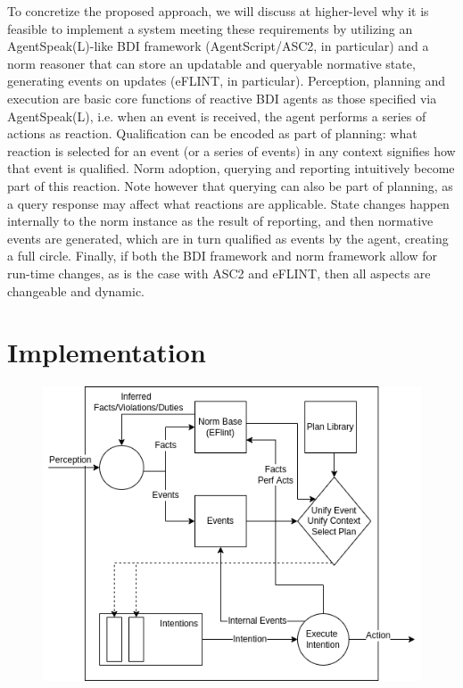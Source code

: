 
To concretize the proposed approach, we will discuss at higher-level why it is feasible to implement a system meeting these requirements by utilizing an AgentSpeak(L)-like BDI framework (AgentScript/ASC2, in particular) and a norm reasoner that can store an updatable and queryable normative state, generating events on updates (eFLINT, in particular). Perception, planning and execution are basic core functions of reactive BDI agents as those specified via AgentSpeak(L), i.e. when an event is received, the agent performs a series of actions as reaction. Qualification can be encoded as part of planning: what reaction is selected for an event (or a series of events) in any context signifies how that event is qualified. Norm adoption, querying and reporting intuitively become part of this reaction. Note however that querying can also be part of planning, as a query response may affect what reactions are applicable. State changes happen internally to the norm instance as the result of reporting, and then normative events are generated, which are in turn qualified as events by the agent, creating a full circle. Finally, if both the BDI framework and norm framework allow for run-time changes, as is the case with ASC2 and eFLINT, then all aspects are changeable and dynamic. 
%

\section{Implementation}
\label{sec:impl}
\label{sec:implementation}
\begin{figure}[t]
\centering
\begin{minipage}[b]{.7\linewidth}
  \centering
  \includegraphics[width=\textwidth]{ch4/nbdi.png}
  \label{fig:nbdi}
\end{minipage}
\end{figure}
%

